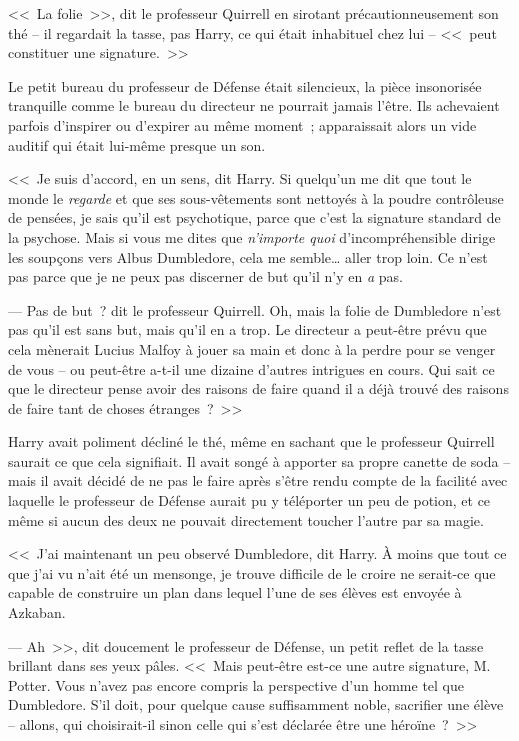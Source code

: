 <<~La folie~>>, dit le professeur Quirrell en sirotant précautionneusement son thé -- il regardait la tasse, pas Harry, ce qui était inhabituel chez lui -- <<~peut constituer une signature.~>>

Le petit bureau du professeur de Défense était silencieux, la pièce insonorisée tranquille comme le bureau du directeur ne pourrait jamais l'être. Ils achevaient parfois d'inspirer ou d'expirer au même moment~; apparaissait alors un vide auditif qui était lui-même presque un son.

<<~Je suis d'accord, en un sens, dit Harry. Si quelqu'un me dit que tout le monde le \emph{regarde} et que ses sous-vêtements sont nettoyés à la poudre contrôleuse de pensées, je sais qu'il est psychotique, parce que c'est la signature standard de la psychose. Mais si vous me dites que \emph{n'importe quoi} d'incompréhensible dirige les soupçons vers Albus Dumbledore, cela me semble… aller trop loin. Ce n'est pas parce que je ne peux pas discerner de but qu'il n'y en \emph{a} pas.

--- Pas de but~? dit le professeur Quirrell. Oh, mais la folie de Dumbledore n'est pas qu'il est sans but, mais qu'il en a trop. Le directeur a peut-être prévu que cela mènerait Lucius Malfoy à jouer sa main et donc à la perdre pour se venger de vous -- ou peut-être a-t-il une dizaine d'autres intrigues en cours. Qui sait ce que le directeur pense avoir des raisons de faire quand il a déjà trouvé des raisons de faire tant de choses étranges~?~>>

Harry avait poliment décliné le thé, même en sachant que le professeur Quirrell saurait ce que cela signifiait. Il avait songé à apporter sa propre canette de soda -- mais il avait décidé de ne pas le faire après s'être rendu compte de la facilité avec laquelle le professeur de Défense aurait pu y téléporter un peu de potion, et ce même si aucun des deux ne pouvait directement toucher l'autre par sa magie.

<<~J'ai maintenant un peu observé Dumbledore, dit Harry. À moins que tout ce que j'ai vu n'ait été un mensonge, je trouve difficile de le croire ne serait-ce que capable de construire un plan dans lequel l'une de ses élèves est envoyée à Azkaban.

--- Ah~>>, dit doucement le professeur de Défense, un petit reflet de la tasse brillant dans ses yeux pâles. <<~Mais peut-être est-ce une autre signature, M. Potter. Vous n'avez pas encore compris la perspective d'un homme tel que Dumbledore. S'il doit, pour quelque cause suffisamment noble, sacrifier une élève -- allons, qui choisirait-il sinon celle qui s'est déclarée être une héroïne~?~>>

